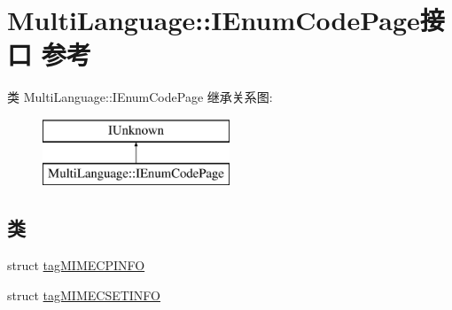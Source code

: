 \hypertarget{interface_multi_language_1_1_i_enum_code_page}{}\section{Multi\+Language\+:\+:I\+Enum\+Code\+Page接口 参考}
\label{interface_multi_language_1_1_i_enum_code_page}
类 Multi\+Language\+:\+:I\+Enum\+Code\+Page 继承关系图\+:\begin{figure}[H]
\begin{center}
\leavevmode
\includegraphics[height=2.000000cm]{interface_multi_language_1_1_i_enum_code_page}
\end{center}
\end{figure}
\subsection*{类}
\begin{DoxyCompactItemize}
\item 
struct \hyperlink{struct_multi_language_1_1_i_enum_code_page_1_1tag_m_i_m_e_c_p_i_n_f_o}{tag\+M\+I\+M\+E\+C\+P\+I\+N\+FO}
\item 
struct \hyperlink{struct_multi_language_1_1_i_enum_code_page_1_1tag_m_i_m_e_c_s_e_t_i_n_f_o}{tag\+M\+I\+M\+E\+C\+S\+E\+T\+I\+N\+FO}
\end{DoxyCompactItemize}
